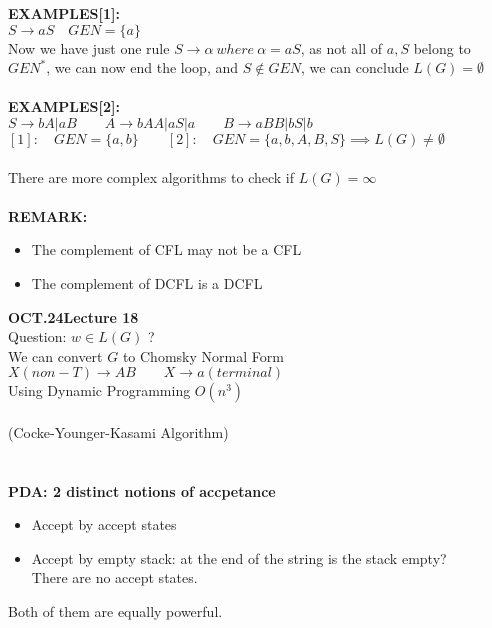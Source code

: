 \documentclass[11pt]{article}
\begin{document}
\textbf{EXAMPLES[1]:}\\
$S \to aS \quad GEN = \{ a \}$\\
Now we have just one rule $S \to \alpha \ where\  \alpha = aS$, as not all of $a, S$ belong to $GEN^*$, we can now end the loop, and $S \notin GEN$, we can conclude $L(G) = \emptyset$\\
\\
\textbf{EXAMPLES[2]:}\\
$S \to bA | aB \quad \quad A \to bAA|aS|a \quad\quad B\to aBB|bS|b$\\
$[1]:\quad GEN = \{a, b\} \quad\quad [2]:\quad GEN = \{ a, b, A, B, S \} \implies L(G) \neq \emptyset $
\\
\\
There are more complex algorithms to check if $L(G) = \infty$
\\
\\
\textbf{REMARK:}
\begin{itemize}
	\item The complement of CFL may not be a CFL
	\item The complement of DCFL is a DCFL
\end{itemize}





\textbf{OCT.24\quad\quad Lecture 18}\\
Question: $w \in L(G)$ ? \\
We can convert $G$ to Chomsky Normal Form $X(non-T) \to AB \quad \quad X \to a (terminal)$\\
Using Dynamic Programming $O(n^3)$\\
\\
(Cocke-Younger-Kasami Algorithm)
\\
\\
\\
\textbf{PDA: 2 distinct notions of accpetance}
\begin{itemize}
	\item Accept by accept states
	\item Accept by empty stack: at the end of the string is the stack empty?\\
	There are no accept states.
\end{itemize}
Both of them are equally powerful.
\end{document}
